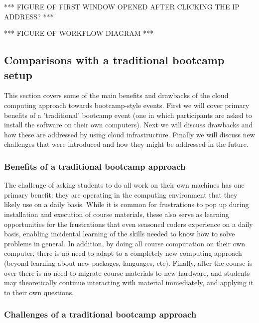 \begin{enumerate}
*** FIGURE OF FIRST WINDOW OPENED AFTER CLICKING THE IP ADDRESS? ***

\end{enumerate}

*** FIGURE OF WORKFLOW DIAGRAM ***

\subsection{Comparisons with a traditional bootcamp setup}

This section covers some of the main benefits and drawbacks of the cloud
computing approach towards bootcamp-style events. First we will cover primary
benefits of a 'traditional' bootcamp event (one in which participants are asked
to install the software on their own computers). Next we will discuss drawbacks
and how these are addressed by using cloud infrastructure. Finally we will
discuss new challenges that were introduced and how they might be addressed in
the future.

\subsubsection{Benefits of a traditional bootcamp approach}

The challenge of asking students to do all work on their own machines has one
primary benefit: they are operating in the computing environment that they
likely use on a daily basis. While it is common for frustrations to pop up
during installation and execution of course materials, these also serve as
learning opportunities for the frustrations that even seasoned coders experience
on a daily basis, enabling incidental learning of the skills needed to know how
to solve problems in general. In addition, by doing all course computation on
their own computer, there is no need to adapt to a completely new computing
approach (beyond learning about new packages, languages, etc). Finally, after
the course is over there is no need to migrate course materials to new hardware,
and students may theoretically continue interacting with material immediately,
and applying it to their own questions.

\subsubsection{Challenges of a traditional bootcamp approach}

